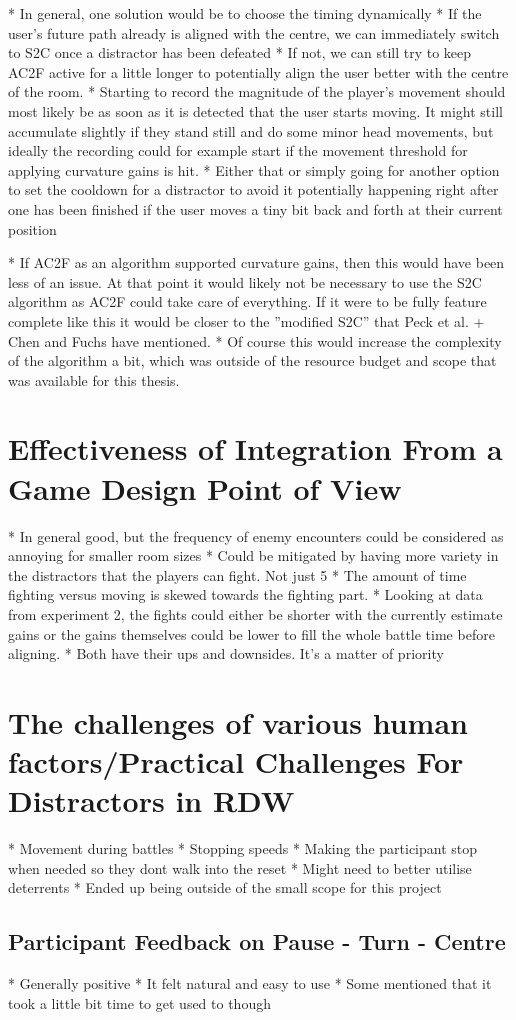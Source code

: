 * In general, one solution would be to choose the timing dynamically
   * If the user's future path already is aligned with the centre, we can immediately switch to S2C once a distractor has been defeated
   * If not, we can still try to keep AC2F active for a little longer to potentially align the user better with the centre of the room. 
   * Starting to record the magnitude of the player's movement should most likely be as soon as it is detected that the user starts moving. It might still accumulate slightly if they stand still and do some minor head movements, but ideally the recording could for example start if the movement threshold for applying curvature gains is hit. 
      * Either that or simply going for another option to set the cooldown for a distractor to avoid it potentially happening right after one has been finished if the user moves a tiny bit back and forth at their current position
    
* If AC2F as an algorithm supported curvature gains, then this would have been less of an issue. At that point it would likely not be necessary to use the S2C algorithm as AC2F could take care of everything. If it were to be fully feature complete like this it would be closer to the ''modified S2C'' that Peck et al. + Chen and Fuchs have mentioned. 
   * Of course this would increase the complexity of the algorithm a bit, which was outside of the resource budget and scope that was available for this thesis. 

\section{Effectiveness of Integration From a Game Design Point of View}

* In general good, but the frequency of enemy encounters could be considered as annoying for smaller room sizes
   * Could be mitigated by having more variety in the distractors that the players can fight. Not just 5
   * The amount of time fighting versus moving is skewed towards the fighting part.
   * Looking at data from experiment 2, the fights could either be shorter with the currently estimate gains or the gains themselves could be lower to fill the whole battle time before aligning. 
      * Both have their ups and downsides. It's a matter of priority

\section{The challenges of various human factors/Practical Challenges For Distractors in RDW}
* Movement during battles
* Stopping speeds
     * Making the participant stop when needed so they dont walk into the reset
        * Might need to better utilise deterrents
            * Ended up being outside of the small scope for this project
            
            
\subsection{Participant Feedback on Pause - Turn - Centre}
* Generally positive
* It felt natural and easy to use
* Some mentioned that it took a little bit time to get used to though